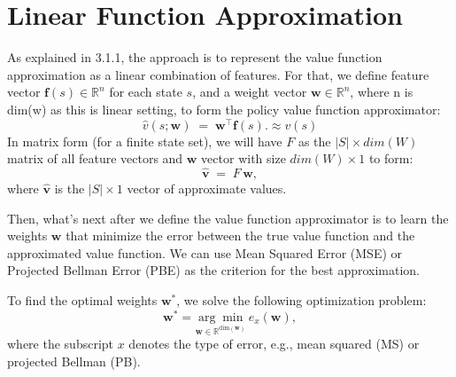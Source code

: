 \section{Linear Function Approximation}
As explained in 3.1.1, the approach is to represent the value function approximation as a linear combination of features. For that, we define feature vector \(\mathbf{f}(s) \in \mathbb{R}^n\) for each state \(s\), and a weight vector \(\mathbf{w} \in \mathbb{R}^n\), where n is dim(w) as this is linear setting, to form the policy value function approximator:
\[
\hat{v}(s;\mathbf{w}) \;=\; \mathbf{w}^\top \mathbf{f}(s). \approx v(s)
\]
In matrix form (for a finite state set), we will have \(F\) as the \(|S|\times dim(W)\) matrix of all feature vectors and \(\mathbf{w}\) vector with size \(dim(W)\times 1\) to form:
\[
\hat{\mathbf{v}} \;=\; F \,\mathbf{w},
\]
where \(\hat{\mathbf{v}}\) is the \(|S|\times 1\) vector of approximate values.

Then, what's next after we define the value function approximator is to learn the weights \(\mathbf{w}\) that minimize the error between the true value function and the approximated value function. We can use Mean Squared Error (MSE) or Projected Bellman Error (PBE) as the criterion for the best approximation.

To find the optimal weights \(\mathbf{w}^*\), we solve the following optimization problem:
\[
\mathbf{w}^* = \underset{\mathbf{w} \in \mathbb{R}^{\text{dim}(\mathbf{w})}}{\arg\min} \, e_x(\mathbf{w}),
\]
where the subscript \(x\) denotes the type of error, e.g., mean squared (MS) or projected Bellman (PB).

